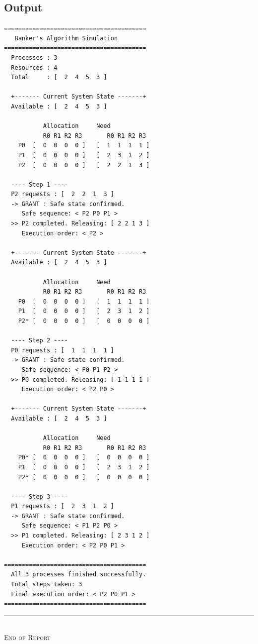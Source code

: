 \documentclass[11pt,a4paper]{article}
\begin{document}
\subsection*{Output}
\begin{outputbox}
\begin{lstlisting}[style=outputstyle]
========================================
   Banker's Algorithm Simulation
========================================
  Processes : 3
  Resources : 4
  Total     : [  2  4  5  3 ]

  +------- Current System State -------+
  Available : [  2  4  5  3 ]

           Allocation     Need
           R0 R1 R2 R3       R0 R1 R2 R3
    P0  [  0  0  0  0 ]   [  1  1  1  1 ]
    P1  [  0  0  0  0 ]   [  2  3  1  2 ]
    P2  [  0  0  0  0 ]   [  2  2  1  3 ]

  ---- Step 1 ----
  P2 requests : [  2  2  1  3 ]
  -> GRANT : Safe state confirmed.
     Safe sequence: < P2 P0 P1 >
  >> P2 completed. Releasing: [ 2 2 1 3 ]
     Execution order: < P2 >

  +------- Current System State -------+
  Available : [  2  4  5  3 ]

           Allocation     Need
           R0 R1 R2 R3       R0 R1 R2 R3
    P0  [  0  0  0  0 ]   [  1  1  1  1 ]
    P1  [  0  0  0  0 ]   [  2  3  1  2 ]
    P2* [  0  0  0  0 ]   [  0  0  0  0 ]

  ---- Step 2 ----
  P0 requests : [  1  1  1  1 ]
  -> GRANT : Safe state confirmed.
     Safe sequence: < P0 P1 P2 >
  >> P0 completed. Releasing: [ 1 1 1 1 ]
     Execution order: < P2 P0 >

  +------- Current System State -------+
  Available : [  2  4  5  3 ]

           Allocation     Need
           R0 R1 R2 R3       R0 R1 R2 R3
    P0* [  0  0  0  0 ]   [  0  0  0  0 ]
    P1  [  0  0  0  0 ]   [  2  3  1  2 ]
    P2* [  0  0  0  0 ]   [  0  0  0  0 ]

  ---- Step 3 ----
  P1 requests : [  2  3  1  2 ]
  -> GRANT : Safe state confirmed.
     Safe sequence: < P1 P2 P0 >
  >> P1 completed. Releasing: [ 2 3 1 2 ]
     Execution order: < P2 P0 P1 >

========================================
  All 3 processes finished successfully.
  Total steps taken: 3
  Final execution order: < P2 P0 P1 >
========================================
\end{lstlisting}
\end{outputbox}

\vfill
\begin{center}
{\color{rulegray}\rule{0.4\linewidth}{0.6pt}}\\[0.3cm]
{\small\textsc{End of Report}}
\end{center}
\end{document}

